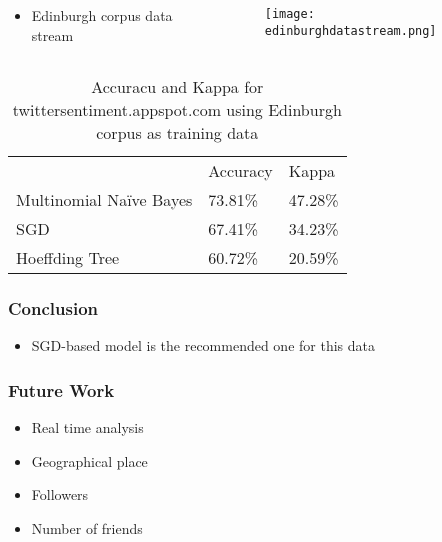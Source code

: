 \begin{frame}
	\begin{columns}
		\begin{column}{0.3\textwidth}
			\begin{itemize}
				\item Edinburgh corpus data stream
			\end{itemize}
		\end{column}
		\begin{column}{0.7\textwidth}  %
			\begin{figure}
				\centering
				\texttt{[image: edinburghdatastream.png]}
			\end{figure}
		\end{column}
	\end{columns}
\end{frame}

\begin{frame}
	\begin{table}[htb]
		\centering
		\begin{tabular}{lll}
			\multicolumn{1}{c}{} 	& Accuracy 		& Kappa\\ \cmidrule{1-3}
			Multinomial Naïve Bayes	& \num{73.81}\%	& \num{47.28}\%\\
			SGD						& \num{67.41}\%	& \num{34.23}\%\\
			Hoeffding Tree			& \num{60.72}\%	& \num{20.59}\%\\ \cmidrule{1-3}
		\end{tabular}
		\caption{Accuracu and Kappa for twittersentiment.appspot.com using Edinburgh corpus as training data}
	\end{table}
\end{frame}

\begin{frame}
	\frametitle{Conclusion}
	\begin{itemize}
		\item SGD-based model is the recommended one for this data
	\end{itemize}
\end{frame}

\begin{frame}
	\frametitle{Future Work}
	\begin{itemize}
		\item Real time analysis
		\item Geographical place
		\item Followers
		\item Number of friends
	\end{itemize}
\end{frame}